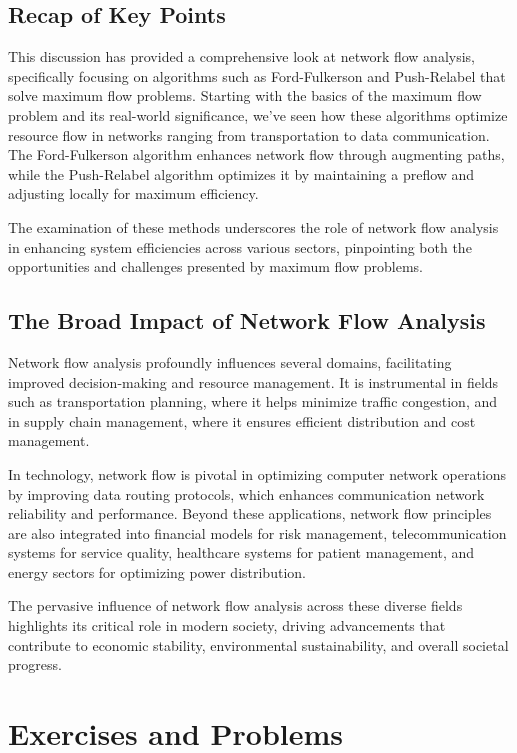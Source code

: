 \documentclass[12pt]{book} %
\begin{document}
\subsection{Recap of Key Points}
This discussion has provided a comprehensive look at network flow analysis, specifically focusing on algorithms such as Ford-Fulkerson and Push-Relabel that solve maximum flow problems. Starting with the basics of the maximum flow problem and its real-world significance, we've seen how these algorithms optimize resource flow in networks ranging from transportation to data communication. The Ford-Fulkerson algorithm enhances network flow through augmenting paths, while the Push-Relabel algorithm optimizes it by maintaining a preflow and adjusting locally for maximum efficiency.

The examination of these methods underscores the role of network flow analysis in enhancing system efficiencies across various sectors, pinpointing both the opportunities and challenges presented by maximum flow problems.

\subsection{The Broad Impact of Network Flow Analysis}
Network flow analysis profoundly influences several domains, facilitating improved decision-making and resource management. It is instrumental in fields such as transportation planning, where it helps minimize traffic congestion, and in supply chain management, where it ensures efficient distribution and cost management.

In technology, network flow is pivotal in optimizing computer network operations by improving data routing protocols, which enhances communication network reliability and performance. Beyond these applications, network flow principles are also integrated into financial models for risk management, telecommunication systems for service quality, healthcare systems for patient management, and energy sectors for optimizing power distribution.

The pervasive influence of network flow analysis across these diverse fields highlights its critical role in modern society, driving advancements that contribute to economic stability, environmental sustainability, and overall societal progress.




\section{Exercises and Problems}
\end{document}
